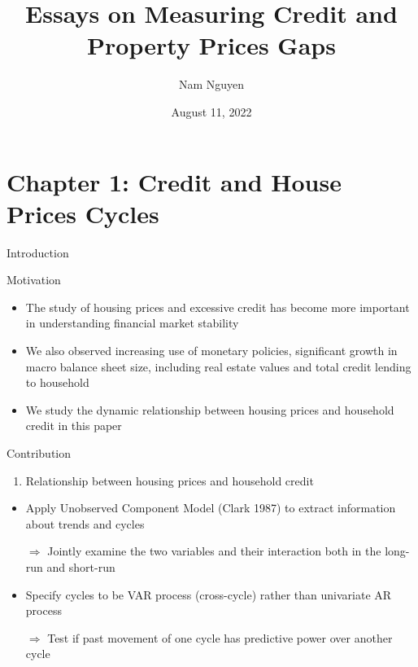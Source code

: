 \documentclass[
  ignorenonframetext,
]{beamer}
\title{Essays on Measuring Credit and Property Prices Gaps}
\author{Nam Nguyen}
\date{August 11, 2022}
\institute{UWM}
\providecommand{\tightlist}{%
  \setlength{\itemsep}{0pt}\setlength{\parskip}{0pt}}
\begin{document}
\frame{\titlepage}

\hypertarget{chapter-1-credit-and-house-prices-cycles}{%
\section{Chapter 1: Credit and House Prices
Cycles}\label{chapter-1-credit-and-house-prices-cycles}}

\begin{frame}{Introduction}
\protect\hypertarget{introduction}{}
\begin{block}{Motivation}
\protect\hypertarget{motivation}{}
\begin{itemize}
\item
  The study of housing prices and excessive credit has become more
  important in understanding financial market stability
\item
  We also observed increasing use of monetary policies, significant
  growth in macro balance sheet size, including real estate values and
  total credit lending to household
\item
  We study the dynamic relationship between housing prices and household
  credit in this paper
\end{itemize}
\end{block}
\end{frame}

\begin{frame}{Contribution}
\protect\hypertarget{contribution}{}
\begin{enumerate}
\tightlist
\item
  Relationship between housing prices and household credit
\end{enumerate}

\begin{itemize}
\item
  Apply Unobserved Component Model (Clark 1987) to extract information
  about trends and cycles

  \(\Rightarrow\) Jointly examine the two variables and their
  interaction both in the long-run and short-run
\item
  Specify cycles to be VAR process (cross-cycle) rather than univariate
  AR process

  \(\Rightarrow\) Test if past movement of one cycle has predictive
  power over another cycle
\end{itemize}
\end{frame}
\end{document}
